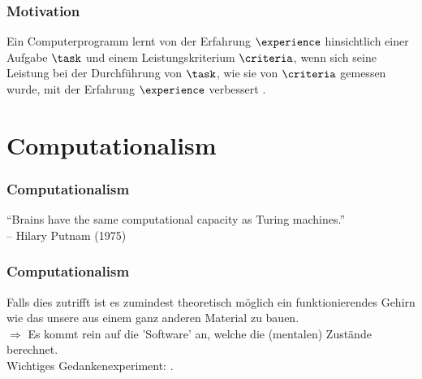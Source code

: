 \documentclass[german,aspectratio=169]{beamer}
\begin{document}
\begin{frame}
	\frametitle{Motivation}
	\begin{definition}
		Ein Computerprogramm lernt von der Erfahrung $\experience$ hinsichtlich einer Aufgabe $\task$ und einem Leistungskriterium $\criteria$, 
		wenn sich seine Leistung bei der Durchführung von $\task$, wie sie von $\criteria$ gemessen wurde, mit der Erfahrung $\experience$ verbessert \cite{Mitchell1997}.   
	\end{definition}
\end{frame}

\section{Computationalism}
\begin{frame}
	\frametitle{Computationalism}
	\begin{quoting}
		``Brains have the same computational capacity as Turing machines.''\\ -- Hilary Putnam (1975)
	\end{quoting}
\end{frame}

\begin{frame}
	\frametitle{Computationalism}
Falls dies zutrifft ist es zumindest theoretisch möglich ein funktionierendes Gehirn wie das unsere aus einem ganz anderen Material zu bauen.\\
\vspace{0.5cm}
$\Rightarrow$ Es kommt rein auf die 'Software' an, welche die (mentalen) Zustände berechnet.\\
\vspace{0.5cm}
Wichtiges Gedankenexperiment: .
\end{frame}
\end{document}
